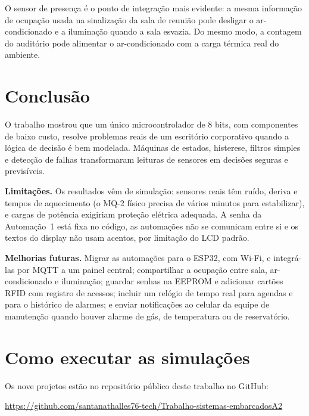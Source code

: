 \documentclass[12pt]{article}
\begin{document}
O sensor de presença é o ponto de integração mais evidente: a mesma informação de ocupação usada na sinalização da sala de reunião pode desligar o ar-condicionado e a iluminação quando a sala esvazia. Do mesmo modo, a contagem do auditório pode alimentar o ar-condicionado com a carga térmica real do ambiente.

\section{Conclusão}\label{sec:conclusao}

O trabalho mostrou que um único microcontrolador de 8 bits, com componentes de baixo custo, resolve problemas reais de um escritório corporativo quando a lógica de decisão é bem modelada. Máquinas de estados, histerese, filtros simples e detecção de falhas transformaram leituras de sensores em decisões seguras e previsíveis.

\textbf{Limitações.} Os resultados vêm de simulação: sensores reais têm ruído, deriva e tempos de aquecimento (o MQ-2 físico precisa de vários minutos para estabilizar), e cargas de potência exigiriam proteção elétrica adequada. A senha da Automação~1 está fixa no código, as automações não se comunicam entre si e os textos do display não usam acentos, por limitação do LCD padrão.

\textbf{Melhorias futuras.} Migrar as automações para o ESP32, com Wi-Fi, e integrá-las por MQTT a um painel central; compartilhar a ocupação entre sala, ar-condicionado e iluminação; guardar senhas na EEPROM e adicionar cartões RFID com registro de acessos; incluir um relógio de tempo real para agendas e para o histórico de alarmes; e enviar notificações ao celular da equipe de manutenção quando houver alarme de gás, de temperatura ou de reservatório.




\appendix

\section{Como executar as simulações}\label{ap:executar}

Os nove projetos estão no repositório público deste trabalho no GitHub:

\begin{center}\url{https://github.com/santanathalles76-tech/Trabalho-sistemas-embarcadosA2}\end{center}
\end{document}
